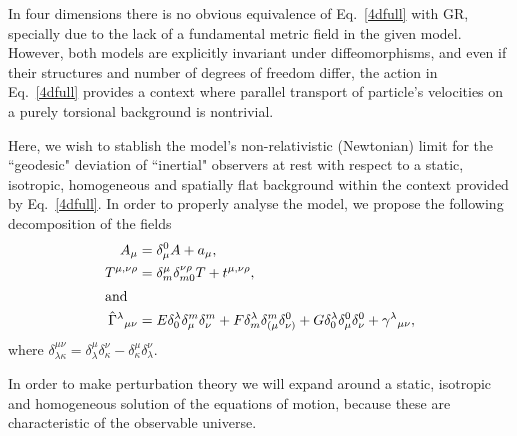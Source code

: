 \documentclass[twocolumn,aps,
  showpacs,showkeys,prd,superscriptaddress]{revtex4-1}
\begin{document}
In four dimensions there is no obvious equivalence of Eq.~\eqref{4dfull} with GR, specially due to the lack of a fundamental metric field in the given model. However, both models are explicitly invariant under diffeomorphisms, and even if their structures and number of degrees of freedom differ, the action in Eq.~\eqref{4dfull} provides a context where parallel transport of particle's velocities on a purely torsional background is nontrivial.

Here, we wish to stablish the model's non-relativistic (Newtonian) limit for the ``geodesic" deviation of ``inertial" observers at rest with respect to a static, isotropic, homogeneous and spatially flat background within the context provided by Eq.~\eqref{4dfull}. In order to properly analyse the model, we  propose the following decomposition of the fields
\begin{align}
  A_\mu &= \delta_\mu^0 A + a_\mu,\\
  T^{\mu,\nu\rho} &= \delta^{\mu}_m\delta^{\nu\rho}_{m0}T + t^{\mu,\nu\rho},\\
  \shortintertext{and}
  \hat{\Gamma}^\lambda{}_{\mu\nu} &= E \delta^\lambda_0 \delta^m_\mu \delta^m_\nu + F \delta^\lambda_m \delta^m_{(\mu}\delta^0_{\nu)} + G\delta^\lambda_0 \delta^0_{\mu}\delta^0_{\nu} + \gamma^\lambda{}_{\mu\nu},
\end{align}
where $\delta^{\mu\nu}_{\lambda\kappa}=\delta^{\mu}_{\lambda}\delta^{\nu}_{\kappa}-\delta^{\mu}_{\kappa}\delta^{\nu}_{\lambda}$.


In order to make perturbation theory we will expand around a static, isotropic and homogeneous solution of the equations of motion, because these are characteristic of the observable universe.
\end{document}
